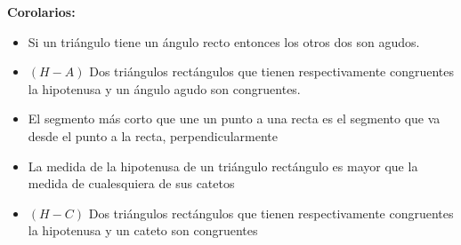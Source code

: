 \documentclass[•]{article}
\begin{document}
\textbf{Corolarios:}
\begin{itemize}
	\item Si un tri\'angulo tiene un \'angulo recto entonces los otros dos son agudos.
	\item $(H-A)$ Dos tri\'angulos rect\'angulos que tienen respectivamente congruentes la hipotenusa y un \'angulo agudo son congruentes.
	\item El segmento m\'as corto que une un punto a una recta es el segmento que va desde el punto a la recta, perpendicularmente
	\item La medida de la hipotenusa de un tri\'angulo rect\'angulo es mayor que la medida de cualesquiera de sus catetos
	\item $(H-C)$ Dos tri\'angulos rect\'angulos que tienen respectivamente congruentes la hipotenusa y un cateto son congruentes

\end{itemize}
\end{document}
